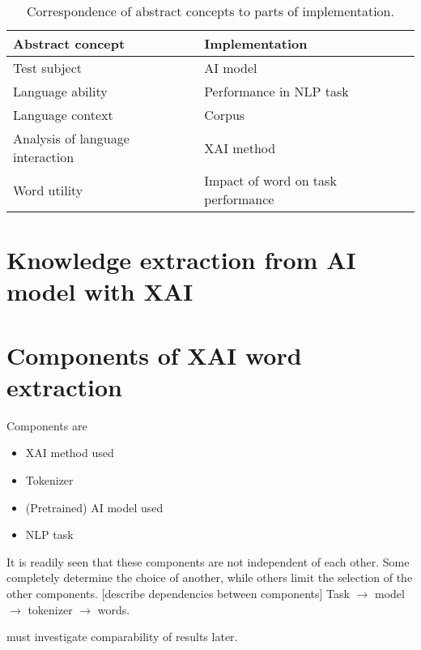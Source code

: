 \begin{table}[ht]
	\centering
	\begin{tabularx}{\textwidth}{|X|X|}
		\hline
		\textbf{Abstract concept}        & \textbf{Implementation}            \\
		\hline
		Test subject                     & AI model                           \\
		\hline
		Language ability                 & Performance in NLP task            \\
		\hline
		Language context                 & Corpus                             \\
		\hline
		Analysis of language interaction & XAI method                         \\
		\hline
		Word utility                     & Impact of word on task performance \\
		\hline
	\end{tabularx}
	\caption{Correspondence of abstract concepts to parts of implementation.}
	\label{table:concept-implementation-correspondence}
\end{table}


\section{Knowledge extraction from AI model with XAI}


\section{Components of XAI word extraction}
Components are
\begin{itemize}
	\item XAI method used
	\item Tokenizer
	\item (Pretrained) AI model used
	\item NLP task
\end{itemize}

It is readily seen that these components are not independent of each other.
Some completely determine the choice of another, while others limit the selection of the other components.
	[describe dependencies between components]
Task $\rightarrow$ model $\rightarrow$ tokenizer $\rightarrow$ words.

must investigate comparability of results later.

